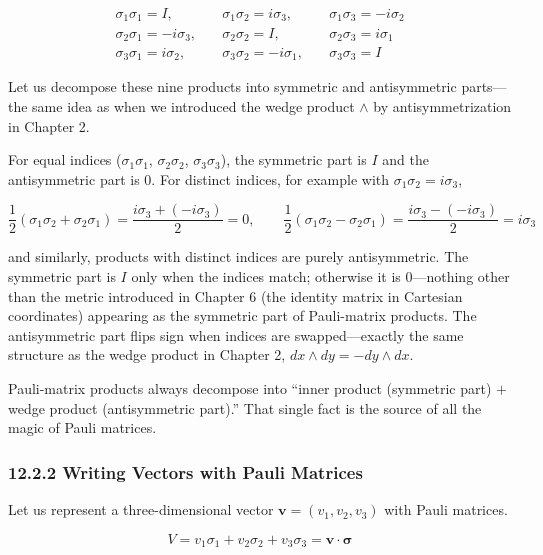 \[
\begin{aligned}
\sigma_1\sigma_1 = I,\quad &\sigma_1\sigma_2 = i\sigma_3,\quad &\sigma_1\sigma_3 = -i\sigma_2 \\
\sigma_2\sigma_1 = -i\sigma_3,\quad &\sigma_2\sigma_2 = I,\quad &\sigma_2\sigma_3 = i\sigma_1 \\
\sigma_3\sigma_1 = i\sigma_2,\quad &\sigma_3\sigma_2 = -i\sigma_1,\quad &\sigma_3\sigma_3 = I
\end{aligned}
\]

Let us decompose these nine products into symmetric and antisymmetric
parts---the same idea as when we introduced the wedge product \(\wedge\)
by antisymmetrization in Chapter 2.

For equal indices (\(\sigma_1\sigma_1\), \(\sigma_2\sigma_2\),
\(\sigma_3\sigma_3\)), the symmetric part is \(I\) and the antisymmetric
part is \(0\). For distinct indices, for example with
\(\sigma_1\sigma_2 = i\sigma_3\),

\[
\frac{1}{2}(\sigma_1\sigma_2 + \sigma_2\sigma_1) = \frac{i\sigma_3 + (-i\sigma_3)}{2} = 0,\qquad
\frac{1}{2}(\sigma_1\sigma_2 - \sigma_2\sigma_1) = \frac{i\sigma_3 - (-i\sigma_3)}{2} = i\sigma_3
\]

and similarly, products with distinct indices are purely antisymmetric.
The symmetric part is \(I\) only when the indices match; otherwise it is
\(0\)---nothing other than the metric introduced in Chapter 6 (the
identity matrix in Cartesian coordinates) appearing as the symmetric
part of Pauli-matrix products. The antisymmetric part flips sign when
indices are swapped---exactly the same structure as the wedge product in
Chapter 2, \(dx\wedge dy = -dy\wedge dx\).

Pauli-matrix products always decompose into ``inner product (symmetric
part) \(+\) wedge product (antisymmetric part).'' That single fact is
the source of all the magic of Pauli matrices.

\hypertarget{writing-vectors-with-pauli-matrices}{%
\subsubsection{12.2.2 Writing Vectors with Pauli
Matrices}\label{writing-vectors-with-pauli-matrices}}

Let us represent a three-dimensional vector
\(\mathbf{v} = (v_1, v_2, v_3)\) with Pauli matrices.

\[V = v_1\sigma_1 + v_2\sigma_2 + v_3\sigma_3 = \mathbf{v}\!\cdot\!\bm{\sigma}\]

